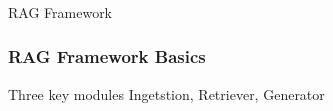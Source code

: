 \begin{frame}[fragile]\frametitle{}
\begin{center}
{\Large RAG Framework}
\end{center}
\end{frame}


\begin{frame}[fragile]\frametitle{RAG Framework Basics}

\begin{block}{Three key modules}
Ingetstion, Retriever, Generator
\end{block}


\end{frame}

